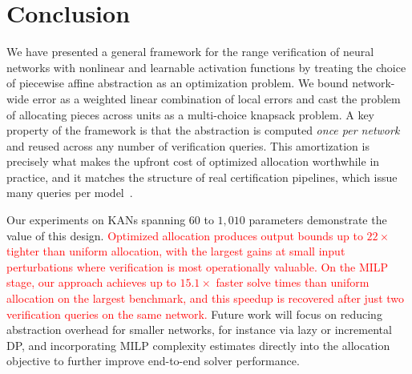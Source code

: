 \section{Conclusion}
We have presented a general framework for the range verification of neural networks with nonlinear and learnable activation functions by treating the choice of piecewise affine abstraction as an optimization problem. We bound network-wide error as a weighted linear combination of local errors and cast the problem of allocating pieces across units as a multi-choice knapsack problem. A key property of the framework is that the abstraction is computed \emph{once per network} and reused across any number of verification queries. This amortization is precisely what makes the upfront cost of optimized allocation worthwhile in practice, and it matches the structure of real certification pipelines, which issue many queries per model~\cite{SinghEtAl2019AbstractDomain}.

Our experiments on KANs spanning $60$ to $1,010$ parameters demonstrate the value of this design. \textcolor{red}{Optimized allocation produces output bounds up to $22\times$ tighter than uniform allocation, with the largest gains at small input perturbations where verification is most operationally valuable. On the MILP stage, our approach achieves up to $15.1\times$ faster solve times than uniform allocation on the largest benchmark, and this speedup is recovered after just two verification queries on the same network.}  Future work will focus on reducing abstraction overhead for smaller networks, for instance via lazy or incremental DP,  and incorporating  MILP complexity estimates directly into the allocation objective to further improve end-to-end solver performance.